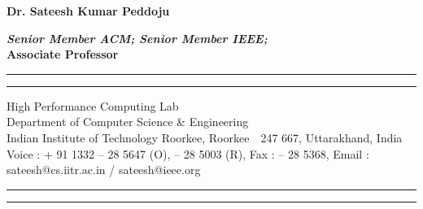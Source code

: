 \documentclass [a4paper,12pt]{article}
\begin{document}
\begin{flushright}
{\bf \large \sc Dr. Sateesh Kumar Peddoju} \vspace{-0.6cm}\\
\end{flushright}
\begin{flushright}
{\bf \scriptsize \emph {\sc Senior Member ACM; Senior Member IEEE;}}\\
\vspace{.0cm} {\bf Associate Professor}\\
\end{flushright}
 
\begin{center}
\hrule \vspace{0.05cm} \hrule \vspace{0.1cm}

\small  High Performance Computing Lab\\ 
Department of Computer Science \& Engineering\\ 
Indian Institute of Technology Roorkee, Roorkee~~247 667, Uttarakhand, India\\
{\scriptsize Voice : + 91 1332 -- 28 5647 (O), -- 28 5003 (R), Fax   :  -- 28 5368, Email : sateesh@cs.iitr.ac.in / sateesh@ieee.org}\\

\vspace{0.1cm} \hrule \vspace{0.05cm} \hrule
\end{center}



\vspace{0.1cm}

%
%
%
%
%
\end{document}
